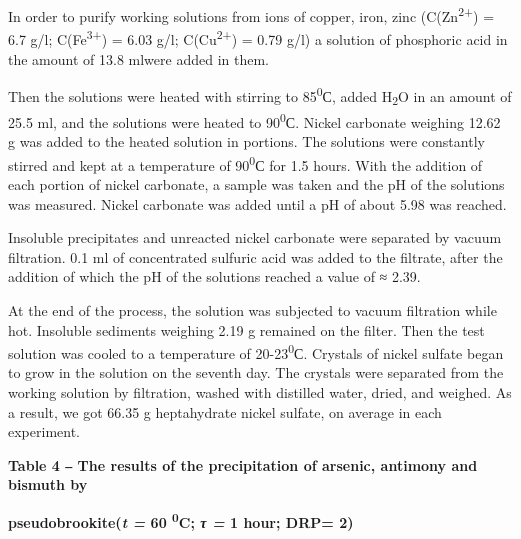 In order to purify working solutions from ions of copper, iron, zinc
(C(Zn\textsuperscript{2+}) = 6.7 g/l; C(Fe\textsuperscript{3+}) = 6.03
g/l; C(Cu\textsuperscript{2+}) = 0.79 g/l) a solution of phosphoric acid
in the amount of 13.8 mlwere added in them.

Then the solutions were heated with stirring to 85\textsuperscript{0}С,
added H\textsubscript{2}O in an amount of 25.5 ml, and the solutions
were heated to 90\textsuperscript{0}С. Nickel carbonate weighing 12.62 g
was added to the heated solution in portions. The solutions were
constantly stirred and kept at a temperature of 90\textsuperscript{0}С
for 1.5 hours. With the addition of each portion of nickel carbonate, a
sample was taken and the pH of the solutions was measured. Nickel
carbonate was added until a pH of about 5.98 was reached.

Insoluble precipitates and unreacted nickel carbonate were separated by
vacuum filtration. 0.1 ml of concentrated sulfuric acid was added to the
filtrate, after the addition of which the pH of the solutions reached a
value of ≈ 2.39.

At the end of the process, the solution was subjected to vacuum
filtration while hot. Insoluble sediments weighing 2.19 g remained on
the filter. Then the test solution was cooled to a temperature of
20-23\textsuperscript{0}С. Crystals of nickel sulfate began to grow in
the solution on the seventh day. The crystals were separated from the
working solution by filtration, washed with distilled water, dried, and
weighed. As a result, we got 66.35 g heptahydrate nickel sulfate, on
average in each experiment.

{\bfseries Table 4 ‒ The results of the precipitation of arsenic, antimony
and bismuth by}

{\bfseries pseudobrookite(\emph{t =} 60 \textsuperscript{0}C; \emph{τ =} 1
hour; DRP= 2)}


